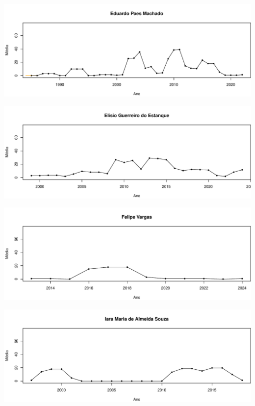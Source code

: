 \documentclass[12pt,brazil]{article}\usepackage[]{graphicx}\usepackage[]{xcolor}
\makeatletter
\def\maxwidth{ %
  \ifdim\Gin@nat@width>\linewidth
    \linewidth
  \else
    \Gin@nat@width
  \fi
}
\makeatother
\begin{document}
\vspace{0.5cm}


{\centering \includegraphics[width=\maxwidth]{figure/mediamovel-6} 

}



\vspace{0.5cm}


{\centering \includegraphics[width=\maxwidth]{figure/mediamovel-7} 

}



\vspace{0.5cm}


{\centering \includegraphics[width=\maxwidth]{figure/mediamovel-8} 

}



\vspace{0.5cm}


{\centering \includegraphics[width=\maxwidth]{figure/mediamovel-9} 

}
\end{document}
